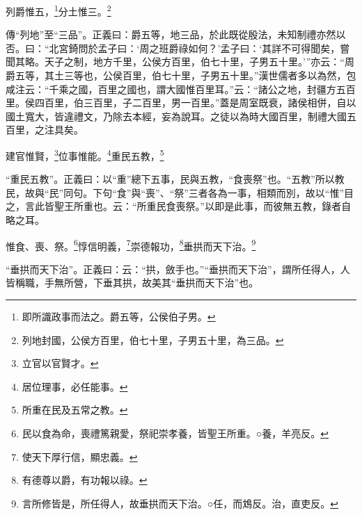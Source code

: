 列爵惟五，\footnote{即所識政事而法之。爵五等，公侯伯子男。}分土惟三。\footnote{列地封國，公侯方百里，伯七十里，子男五十里，為三品。}

{\noindent\zhuan{}\fzbyks 傳“列地”至“三品”。正義曰：爵五等，地三品，於此既從殷法，未知制禮亦然以否。曰：“北宮錡問於孟子曰：‘周之班爵祿如何？’孟子曰：‘其詳不可得聞矣，嘗聞其略。天子之制，地方千里，公侯方百里，伯七十里，子男五十里。’”亦云：“周爵五等，其土三等也，公侯百里，伯七十里，子男五十里。”漢世儒者多以為然，包咸注云：“千乘之國，百里之國也，謂大國惟百里耳。”云：“諸公之地，封疆方五百里。侯四百里，伯三百里，子二百里，男一百里。”蓋是周室既衰，諸侯相併，自以國土寬大，皆違禮文，乃除去本經，妄為說耳。之徒以為時大國百里，制禮大國五百里，之注具矣。 \par}

建官惟賢，\footnote{立官以官賢才。}位事惟能。\footnote{居位理事，必任能事。}重民五教，\footnote{所重在民及五常之教。}

{\noindent\shu{}\fzkt “重民五教”。正義曰：以“重”總下五事，民與五教，“食喪祭”也。“五教”所以教民，故與“民”同句。下句“食”與“喪”、“祭”三者各為一事，相類而別，故以“惟”目之，言此皆聖王所重也。云：“所重民食喪祭。”以即是此事，而彼無五教，錄者自略之耳。 \par}

惟食、喪、祭。\footnote{民以食為命，喪禮篤親愛，祭祀崇孝養，皆聖王所重。○養，羊亮反。}惇信明義，\footnote{使天下厚行信，顯忠義。}崇德報功，\footnote{有德尊以爵，有功報以祿。}垂拱而天下治。\footnote{言所修皆是，所任得人，故垂拱而天下治。○任，而鴆反。治，直吏反。}

{\noindent\shu{}\fzkt “垂拱而天下治”。正義曰：云：“拱，斂手也。”“垂拱而天下治”，謂所任得人，人皆稱職，手無所營，下垂其拱，故美其“垂拱而天下治”也。 \par}

